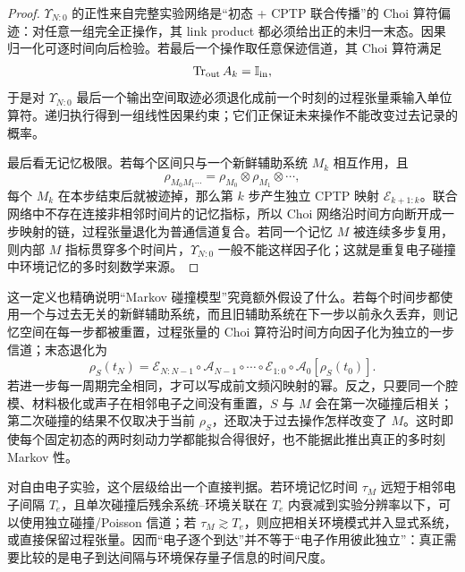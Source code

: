 \begin{proof}
$\Upsilon_{N:0}$ 的正性来自完整实验网络是“初态 + CPTP 联合传播”的 Choi 算符偏迹：对任意一组完全正操作，其 link product 都必须给出正的未归一末态。因果归一化可逐时间向后检验。若最后一个操作取任意保迹信道，其 Choi 算符满足
\[
\operatorname{Tr}_{\rm out}A_k=\mathbb I_{\rm in},
\]
于是对 $\Upsilon_{N:0}$ 最后一个输出空间取迹必须退化成前一个时刻的过程张量乘输入单位算符。递归执行得到一组线性因果约束；它们正保证未来操作不能改变过去记录的概率。

最后看无记忆极限。若每个区间只与一个新鲜辅助系统 $M_k$ 相互作用，且
\[
\rho_{M_0M_1\cdots}
=\rho_{M_0}\otimes\rho_{M_1}\otimes\cdots,
\]
每个 $M_k$ 在本步结束后就被迹掉，那么第 $k$ 步产生独立 CPTP 映射
$\mathscr E_{k+1:k}$。联合网络中不存在连接非相邻时间片的记忆指标，所以 Choi 网络沿时间方向断开成一步映射的链，过程张量退化为普通信道复合。若同一个记忆 $M$ 被连续多步复用，则内部 $M$ 指标贯穿多个时间片，$\Upsilon_{N:0}$ 一般不能这样因子化；这就是重复电子碰撞中环境记忆的多时刻数学来源。
\end{proof}


这一定义也精确说明“Markov 碰撞模型”究竟额外假设了什么。若每个时间步都使用一个与过去无关的新鲜辅助系统，而且旧辅助系统在下一步以前永久丢弃，则记忆空间在每一步都被重置，过程张量的 Choi 算符沿时间方向因子化为独立的一步信道；末态退化为
\[
\rho_S(t_N)
=\mathscr E_{N:N-1}\circ\mathcal A_{N-1}\circ\cdots
\circ\mathscr E_{1:0}\circ\mathcal A_0[\rho_S(t_0)].
\]
若进一步每一周期完全相同，才可以写成前文频闪映射的幂。反之，只要同一个腔模、材料极化或声子在相邻电子之间没有重置，$S$ 与 $M$ 会在第一次碰撞后相关；第二次碰撞的结果不仅取决于当前 $\rho_S$，还取决于过去操作怎样改变了 $M$。这时即使每个固定初态的两时刻动力学都能拟合得很好，也不能据此推出真正的多时刻 Markov 性。

对自由电子实验，这个层级给出一个直接判据。若环境记忆时间 $\tau_M$ 远短于相邻电子间隔 $T_e$，且单次碰撞后残余系统--环境关联在 $T_e$ 内衰减到实验分辨率以下，可以使用独立碰撞/Poisson 信道；若 $\tau_M\gtrsim T_e$，则应把相关环境模式并入显式系统，或直接保留过程张量。因而“电子逐个到达”并不等于“电子作用彼此独立”：真正需要比较的是电子到达间隔与环境保存量子信息的时间尺度。

